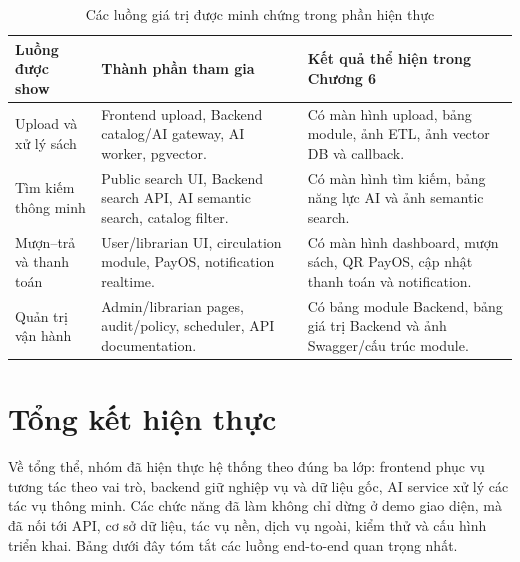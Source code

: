 \begin{table}[H]
\centering
\small
\begin{tabularx}{\textwidth}{|p{3.4cm}|X|p{3.4cm}|}
\hline
\textbf{Luồng được show} & \textbf{Thành phần tham gia} & \textbf{Kết quả thể hiện trong Chương 6} \\
\hline
Upload và xử lý sách &
Frontend upload, Backend catalog/AI gateway, AI worker, pgvector. &
Có màn hình upload, bảng module, ảnh ETL, ảnh vector DB và callback. \\
\hline
Tìm kiếm thông minh &
Public search UI, Backend search API, AI semantic search, catalog filter. &
Có màn hình tìm kiếm, bảng năng lực AI và ảnh semantic search. \\
\hline
Mượn--trả và thanh toán &
User/librarian UI, circulation module, PayOS, notification realtime. &
Có màn hình dashboard, mượn sách, QR PayOS, cập nhật thanh toán và notification. \\
\hline
Quản trị vận hành &
Admin/librarian pages, audit/policy, scheduler, API documentation. &
Có bảng module Backend, bảng giá trị Backend và ảnh Swagger/cấu trúc module. \\
\hline
\end{tabularx}
\caption{Các luồng giá trị được minh chứng trong phần hiện thực}
\label{tab:implementation_value_flows}
\end{table}

\section{Tổng kết hiện thực}

Về tổng thể, nhóm đã hiện thực hệ thống theo đúng ba lớp: frontend phục vụ tương
tác theo vai trò, backend giữ nghiệp vụ và dữ liệu gốc, AI service xử lý các tác
vụ thông minh. Các chức năng đã làm không chỉ dừng ở demo giao diện, mà đã nối
tới API, cơ sở dữ liệu, tác vụ nền, dịch vụ ngoài, kiểm thử và cấu hình triển
khai. Bảng dưới đây tóm tắt các luồng end-to-end quan trọng nhất.

